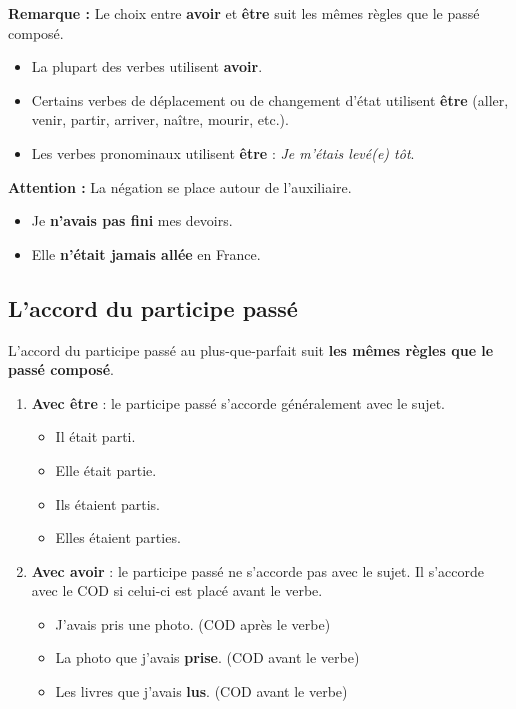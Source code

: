 \documentclass[math,code]{amznotes}
\theoremstyle{remark}
\begin{document}
\begin{notebox}
\textbf{Remarque :} Le choix entre \textbf{avoir} et \textbf{être} suit les mêmes règles que le passé composé.

\begin{itemize}
    \item La plupart des verbes utilisent \textbf{avoir}.
    \item Certains verbes de déplacement ou de changement d'état utilisent \textbf{être} (aller, venir, partir, arriver, naître, mourir, etc.).
    \item Les verbes pronominaux utilisent \textbf{être} : \textit{Je m'étais levé(e) tôt}.
\end{itemize}

\textbf{Attention :} La négation se place autour de l'auxiliaire.

\begin{itemize}
    \item Je \textbf{n'avais pas fini} mes devoirs.
    \item Elle \textbf{n'était jamais allée} en France.
\end{itemize}
\end{notebox}

\subsection*{L'accord du participe passé}

L'accord du participe passé au plus-que-parfait suit \textbf{les mêmes règles que le passé composé}.

\begin{enumerate}
    \item \textbf{Avec être} : le participe passé s'accorde généralement avec le sujet.
    \begin{itemize}
        \item Il était parti.
        \item Elle était partie.
        \item Ils étaient partis.
        \item Elles étaient parties.
    \end{itemize}

    \item \textbf{Avec avoir} : le participe passé ne s'accorde pas avec le sujet. Il s'accorde avec le COD si celui-ci est placé avant le verbe.
    \begin{itemize}
        \item J'avais pris une photo. (COD après le verbe)
        \item La photo que j'avais \textbf{prise}. (COD avant le verbe)
        \item Les livres que j'avais \textbf{lus}. (COD avant le verbe)
    \end{itemize}
\end{enumerate}
\end{document}
